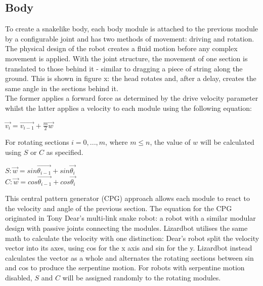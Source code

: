 \documentclass{article}
\begin{document}
\subsection{Body}
To create a snakelike body, each body module is attached to the previous module by a configurable joint  and has two methods of movement: driving and rotation. The physical design of the robot creates a fluid motion before any complex movement is applied. With the joint structure, the movement of one section is translated to those behind it - similar to dragging a piece of string along the ground. This is shown in figure x: the head rotates and, after a delay, creates the same angle in the sections behind it.\\
The former applies a forward force as determined by the drive velocity parameter whilst the latter applies a velocity to each module using the following equation:
\begin{center}
\begin{Large}
$\overrightarrow{v_{i}} = \overrightarrow{v_{i-1}} + \frac{m}{2}\overrightarrow{w} $
\end{Large}
\end{center}
For rotating sections $i = 0, ..., m$, where $m \leq n$, the value of $w$ will be calculated using $S$ or $C$ as specified.\\
\begin{center}
\begin{Large}
$S: \overrightarrow{w} = sin\overrightarrow{\theta_{i-1}} + sin\overrightarrow{\theta_{i}}$
\\[1\baselineskip]
$C: \overrightarrow{w} = cos\overrightarrow{\theta_{i-1}} + cos\overrightarrow{\theta_{i}}$\\
\end{Large}
\end{center}
This central pattern generator (CPG) approach allows each module to react to the velocity and angle of the previous section. The equation for the CPG originated in Tony Dear’s multi-link snake robot: a robot with a similar modular design with passive joints connecting the modules.  Lizardbot utilises the same math to calculate the velocity with one distinction: Dear’s robot split the velocity vector into its axes, using cos for the x axis and sin for the y. Lizardbot instead calculates the vector as a whole and alternates the rotating sections between sin and cos to produce the serpentine motion. For robots with serpentine motion disabled, $S$ and $C$ will be assigned randomly to the rotating modules.\\
\end{document}
